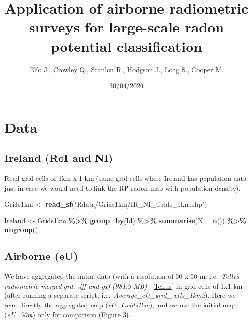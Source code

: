 \documentclass[
  12pt,
]{article}
\title{Application of airborne radiometric surveys for large-scale radon
potential classification}
\author{Elío J., Crowley Q., Scanlon R., Hodgson J., Long S., Cooper M.}
\date{30/04/2020}
\newenvironment{Shaded}{\begin{snugshade}}{\end{snugshade}}
\newcommand{\DataTypeTok}[1]{\textcolor[rgb]{0.13,0.29,0.53}{#1}}
\newcommand{\KeywordTok}[1]{\textcolor[rgb]{0.13,0.29,0.53}{\textbf{#1}}}
\newcommand{\NormalTok}[1]{#1}
\newcommand{\OperatorTok}[1]{\textcolor[rgb]{0.81,0.36,0.00}{\textbf{#1}}}
\newcommand{\StringTok}[1]{\textcolor[rgb]{0.31,0.60,0.02}{#1}}
\begin{document}
\maketitle

{
\hypersetup{linkcolor=}
\setcounter{tocdepth}{2}
\tableofcontents
}
\hypertarget{data}{%
\section{Data}\label{data}}

\hypertarget{ireland-roi-and-ni}{%
\subsection{Ireland (RoI and NI)}\label{ireland-roi-and-ni}}

Read grid cells of 1km x 1 km (same grid cells where Ireland has
population data just in case we would need to link the RP radon map with
population density).

\begin{Shaded}
\begin{Highlighting}[]
\NormalTok{  Grids1km \textless{}{-}}\StringTok{ }\KeywordTok{read\_sf}\NormalTok{(}\StringTok{"Rdata/Grids1km/IR\_NI\_Grids\_1km.shp"}\NormalTok{)}
    
\NormalTok{  Ireland \textless{}{-}}\StringTok{ }\NormalTok{Grids1km }\OperatorTok{\%\textgreater{}\%}
\StringTok{    }\KeywordTok{group\_by}\NormalTok{(Id) }\OperatorTok{\%\textgreater{}\%}
\StringTok{    }\KeywordTok{summarise}\NormalTok{(}\DataTypeTok{N =} \KeywordTok{n}\NormalTok{()) }\OperatorTok{\%\textgreater{}\%}
\StringTok{    }\KeywordTok{ungroup}\NormalTok{()}
\end{Highlighting}
\end{Shaded}

\hypertarget{airborne-eu}{%
\subsection{Airborne (eU)}\label{airborne-eu}}

We have aggregated the initial data (with a resolution of 50 x 50 m;
i.e.~\emph{Tellus radiometric merged grd, tiff and gxf (981.9 MB)} -
\href{https://www.gsi.ie/en-ie/data-and-maps/Pages/Geophysics.aspx}{Tellus})
in grid cells of 1x1 km (after running a separate script,
i.e.~\emph{Average\_eU\_grid\_cells\_1km2}). Here we read directly the
aggregated map (\emph{eU\_Grids1km}), and we use the initial map
(\emph{eU\_50m}) only for comparison (Figure 3).
\end{document}
